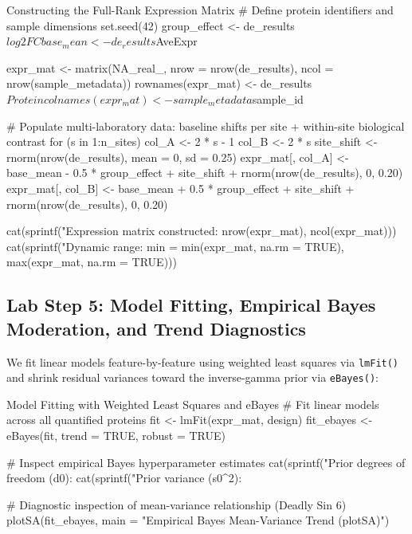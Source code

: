 \documentclass[11pt,twoside,openright]{book}
\begin{document}
\begin{rchunk}{Constructing the Full-Rank Expression Matrix}
# Define protein identifiers and sample dimensions
set.seed(42)
group_effect <- de_results$log2FC
base_mean    <- de_results$AveExpr

expr_mat <- matrix(NA_real_, nrow = nrow(de_results), ncol = nrow(sample_metadata))
rownames(expr_mat) <- de_results$Protein
colnames(expr_mat) <- sample_metadata$sample_id

# Populate multi-laboratory data: baseline shifts per site + within-site biological contrast
for (s in 1:n_sites) {
  col_A <- 2 * s - 1
  col_B <- 2 * s
  site_shift <- rnorm(nrow(de_results), mean = 0, sd = 0.25)
  expr_mat[, col_A] <- base_mean - 0.5 * group_effect + site_shift + rnorm(nrow(de_results), 0, 0.20)
  expr_mat[, col_B] <- base_mean + 0.5 * group_effect + site_shift + rnorm(nrow(de_results), 0, 0.20)
}

cat(sprintf("Expression matrix constructed: %
            nrow(expr_mat), ncol(expr_mat)))
cat(sprintf("Dynamic range: min = %
            min(expr_mat, na.rm = TRUE), max(expr_mat, na.rm = TRUE)))
\end{rchunk}

\subsection{Lab Step 5: Model Fitting, Empirical Bayes Moderation, and Trend Diagnostics}

We fit linear models feature-by-feature using weighted least squares via \texttt{lmFit()} and shrink residual variances toward the inverse-gamma prior via \texttt{eBayes()}:

\begin{rchunk}{Model Fitting with Weighted Least Squares and eBayes}
# Fit linear models across all quantified proteins
fit <- lmFit(expr_mat, design)
fit_ebayes <- eBayes(fit, trend = TRUE, robust = TRUE)

# Inspect empirical Bayes hyperparameter estimates
cat(sprintf("Prior degrees of freedom (d0): %
cat(sprintf("Prior variance (s0^2): %

# Diagnostic inspection of mean-variance relationship (Deadly Sin 6)
plotSA(fit_ebayes, main = "Empirical Bayes Mean-Variance Trend (plotSA)")
\end{rchunk}
\end{document}
